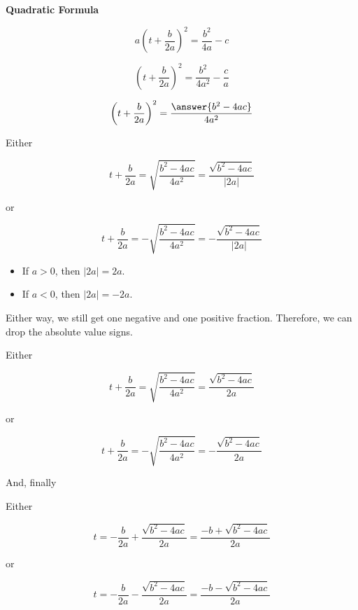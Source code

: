 \documentclass{ximera}
\begin{document}
\begin{explanation} \textbf{\textcolor{red!75!green}{Quadratic Formula}} 


\[ a \left(t + \frac{b}{2 a} \right)^2  = \frac{b^2}{4 a} - c\]

\[ \left(t + \frac{b}{2 a} \right)^2  = \frac{b^2}{4 a^2} - \frac{c}{a}\]

\[ \left(t + \frac{b}{2 a} \right)^2  = \frac{\answer{b^2 - 4 a c}}{4 a^2} \]



Either 


\[ t + \frac{b}{2 a}  = \sqrt{\frac{b^2 - 4 a c}{4 a^2}}  = \frac{\sqrt{b^2 - 4 a c}}{| 2a |}   \]

or


\[ t + \frac{b}{2 a}  = -\sqrt{\frac{b^2 - 4 a c}{4 a^2}} = -\frac{\sqrt{b^2 - 4 a c}}{| 2a |}    \]



\begin{itemize}
\item If $a > 0$, then $| 2a | = 2a$.
\item If $a < 0$, then $| 2a | = -2a$.
\end{itemize}

Either way, we still get one negative and one positive fraction.  Therefore, we can drop the absolute value signs.  





Either 


\[ t + \frac{b}{2 a}  = \sqrt{\frac{b^2 - 4 a c}{4 a^2}}  = \frac{\sqrt{b^2 - 4 a c}}{2a}   \]

or


\[ t + \frac{b}{2 a}  = -\sqrt{\frac{b^2 - 4 a c}{4 a^2}} = -\frac{\sqrt{b^2 - 4 a c}}{2a}    \]










And, finally 






Either 


\[ t   = - \frac{b}{2 a} + \frac{\sqrt{b^2 - 4 a c}}{2a}  = \frac{-b + \sqrt{b^2 - 4 a c}}{2a}      \]

or


\[ t  = - \frac{b}{2 a}  -\frac{\sqrt{b^2 - 4 a c}}{2a} =    \frac{-b - \sqrt{b^2 - 4 a c}}{2a}      \]

\end{explanation}
\end{document}
